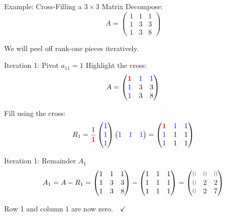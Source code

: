 \documentclass[10pt]{beamer}
\theoremstyle{definition}
\newcommand{\pvt}[1]{{\color{red}\mathbf{#1}}}       %
\newcommand{\crs}[1]{{\color{blue}#1}}                %
\newcommand{\rem}[1]{{\color{gray}#1}}                %
\begin{document}
\begin{frame}{Example: Cross-Filling a $3 \times 3$ Matrix}
Decompose:
$$A = \begin{pmatrix}
1 & 1 & 1 \\
1 & 3 & 3 \\
1 & 3 & 8
\end{pmatrix}$$

\vfill
We will peel off rank-one pieces iteratively.
\end{frame}

\begin{frame}{Iteration 1: Pivot $a_{11} = 1$}
Highlight the cross:
$$A = \begin{pmatrix}
\pvt{1} & \crs{1} & \crs{1} \\
\crs{1} & 3 & 3 \\
\crs{1} & 3 & 8
\end{pmatrix}$$

\vfill
Fill using the cross:
$$R_1 = \frac{1}{\pvt{1}}
\begin{pmatrix} \crs{1} \\ \crs{1} \\ \crs{1} \end{pmatrix}
\begin{pmatrix} \crs{1} & \crs{1} & \crs{1} \end{pmatrix}
= \begin{pmatrix}
\pvt{1} & \crs{1} & \crs{1} \\
\crs{1} & 1 & 1 \\
\crs{1} & 1 & 1
\end{pmatrix}$$
\end{frame}

\begin{frame}{Iteration 1: Remainder $A_1$}
$$A_1 = A - R_1 = \begin{pmatrix}
1 & 1 & 1 \\
1 & 3 & 3 \\
1 & 3 & 8
\end{pmatrix}
- \begin{pmatrix}
1 & 1 & 1 \\
1 & 1 & 1 \\
1 & 1 & 1
\end{pmatrix}
= \begin{pmatrix}
\rem{0} & \rem{0} & \rem{0} \\
\rem{0} & 2 & 2 \\
\rem{0} & 2 & 7
\end{pmatrix}$$

\vfill
Row 1 and column 1 are now \rem{zero}.\ \ $\checkmark$
\end{frame}
\end{document}
